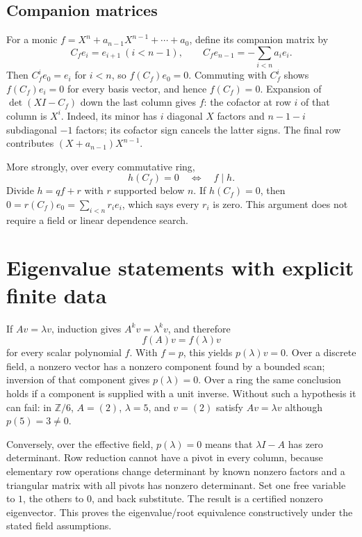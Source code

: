\subsection{Companion matrices}

For a monic $f=X^n+a_{n-1}X^{n-1}+\cdots+a_0$, define its companion matrix
by
\[
 C_fe_i=e_{i+1}\ (i<n-1),\qquad
 C_fe_{n-1}=-\sum_{i<n}a_ie_i.
\]
Then $C_f^ie_0=e_i$ for $i<n$, so $f(C_f)e_0=0$. Commuting with
$C_f^i$ shows $f(C_f)e_i=0$ for every basis vector, and hence $f(C_f)=0$.
Expansion of $\det(XI-C_f)$ down the last column gives $f$: the cofactor
at row $i$ of that column is $X^i$. Indeed, its minor has $i$ diagonal
$X$ factors and $n-1-i$ subdiagonal $-1$ factors; its cofactor sign
cancels the latter signs. The final row contributes
$(X+a_{n-1})X^{n-1}$.

More strongly, over every commutative ring,
\[
 h(C_f)=0\quad\Longleftrightarrow\quad f\mid h.
\]
Divide $h=qf+r$ with $r$ supported below $n$. If $h(C_f)=0$, then
$0=r(C_f)e_0=\sum_{i<n}r_ie_i$, which says every $r_i$ is zero.
This argument does not require a field or linear dependence search.

\section{Eigenvalue statements with explicit finite data}

If $Av=\lambda v$, induction gives $A^kv=\lambda^kv$, and therefore
\[
 f(A)v=f(\lambda)v
\]
for every scalar polynomial $f$. With $f=p$, this yields $p(\lambda)v=0$.
Over a discrete field, a nonzero vector has a nonzero component found by
a bounded scan; inversion of that component gives $p(\lambda)=0$.
Over a ring the same conclusion holds if a component is supplied with a
unit inverse. Without such a hypothesis it can fail: in $\mathbb Z/6$,
$A=(2)$, $\lambda=5$, and $v=(2)$ satisfy $Av=\lambda v$ although
$p(5)=3\ne0$.

Conversely, over the effective field, $p(\lambda)=0$ means that
$\lambda I-A$ has zero determinant. Row reduction cannot have a pivot
in every column, because elementary row operations change determinant
by known nonzero factors and a triangular matrix with all pivots has
nonzero determinant. Set one free variable to $1$, the others to $0$,
and back substitute. The result is a certified nonzero eigenvector.
This proves the eigenvalue/root equivalence constructively under the
stated field assumptions.

